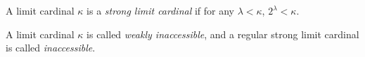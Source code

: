 \documentclass[12pt]{article}
\begin{document}
A limit cardinal $\kappa$ is a \emph{strong limit cardinal} if for any $\lambda<\kappa$, $2^\lambda<\kappa$.

A  limit cardinal $\kappa$ is called \emph{weakly inaccessible}, and a regular strong limit cardinal is called \emph{inaccessible}.
\end{document}
